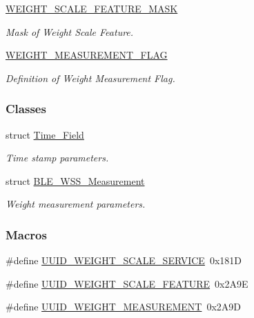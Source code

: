 \begin{DoxyCompactItemize}
\hyperlink{group___w_e_i_g_h_t___s_c_a_l_e___f_e_a_t_u_r_e___m_a_s_k}{W\+E\+I\+G\+H\+T\+\_\+\+S\+C\+A\+L\+E\+\_\+\+F\+E\+A\+T\+U\+R\+E\+\_\+\+M\+A\+SK}
\begin{DoxyCompactList}\small\item\em Mask of Weight Scale Feature. \end{DoxyCompactList}\item 
\hyperlink{group___w_e_i_g_h_t___m_e_a_s_u_r_e_m_e_n_t___f_l_a_g}{W\+E\+I\+G\+H\+T\+\_\+\+M\+E\+A\+S\+U\+R\+E\+M\+E\+N\+T\+\_\+\+F\+L\+AG}
\begin{DoxyCompactList}\small\item\em Definition of Weight Measurement Flag. \end{DoxyCompactList}\end{DoxyCompactItemize}
\subsubsection*{Classes}
\begin{DoxyCompactItemize}
\item 
struct \hyperlink{struct_time___field}{Time\+\_\+\+Field}
\begin{DoxyCompactList}\small\item\em Time stamp parameters. \end{DoxyCompactList}\item 
struct \hyperlink{struct_b_l_e___w_s_s___measurement}{B\+L\+E\+\_\+\+W\+S\+S\+\_\+\+Measurement}
\begin{DoxyCompactList}\small\item\em Weight measurement parameters. \end{DoxyCompactList}\end{DoxyCompactItemize}
\subsubsection*{Macros}
\begin{DoxyCompactItemize}
\item 
\#define \hyperlink{group___b_l_e___w_s_s_gaf784815cdabec28ae2b05cf3013020f7}{U\+U\+I\+D\+\_\+\+W\+E\+I\+G\+H\+T\+\_\+\+S\+C\+A\+L\+E\+\_\+\+S\+E\+R\+V\+I\+CE}~0x181D
\item 
\#define \hyperlink{group___b_l_e___w_s_s_gaafbae015f2646f9ce490c7222daa2491}{U\+U\+I\+D\+\_\+\+W\+E\+I\+G\+H\+T\+\_\+\+S\+C\+A\+L\+E\+\_\+\+F\+E\+A\+T\+U\+RE}~0x2\+A9E
\item 
\#define \hyperlink{group___b_l_e___w_s_s_ga877547a0912dce7701008f628a98de72}{U\+U\+I\+D\+\_\+\+W\+E\+I\+G\+H\+T\+\_\+\+M\+E\+A\+S\+U\+R\+E\+M\+E\+NT}~0x2\+A9D
\end{DoxyCompactItemize}
